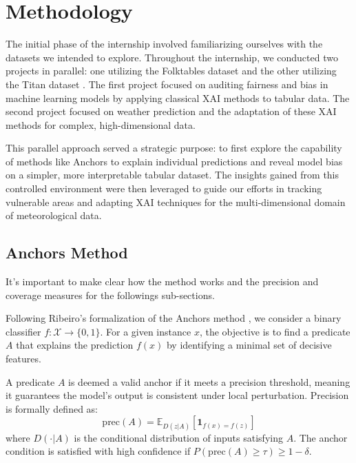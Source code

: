 \section{Methodology}
The initial phase of the internship involved familiarizing ourselves with the datasets we intended to explore.
Throughout the internship, we conducted two projects in parallel: one utilizing the Folktables dataset \cite{folktables} and the other utilizing the Titan dataset \cite{titandataset}. The first project focused on auditing fairness and bias in machine learning models by applying classical XAI methods to tabular data. The second project focused on weather prediction and the adaptation of these XAI methods for complex, high-dimensional data.

This parallel approach served a strategic purpose: to first explore the capability of methods like Anchors to explain individual predictions and reveal model bias on a simpler, more interpretable tabular dataset. The insights gained from this controlled environment were then leveraged to guide our efforts in tracking vulnerable areas and adapting XAI techniques for the multi-dimensional domain of meteorological data.



\subsection{Anchors Method}
\label{sec:anchors-formalization}
It's important to make clear how the method works and the precision and coverage measures for the followings sub-sections.

Following Ribeiro's formalization of the Anchors method \cite{anchors-ribeiro}, we consider a binary classifier $f : \mathcal{X} \rightarrow \{0, 1\}$. For a given instance $x$, the objective is to find a predicate $A$ that explains the prediction $f(x)$ by identifying a minimal set of decisive features.

A predicate $A$ is deemed a valid anchor if it meets a precision threshold, meaning it guarantees the model's output is consistent under local perturbation. Precision is formally defined as:
\begin{equation}
\text{prec}(A) = \mathbb{E}_{D(z|A)} [\mathbf{1}_{f(x) = f(z)}]
\label{eq:prec-anchors}
\end{equation}
where $D(\cdot|A)$ is the conditional distribution of inputs satisfying $A$. The anchor condition is satisfied with high confidence if $P(\text{prec}(A) \geq \tau) \geq 1 - \delta$.

